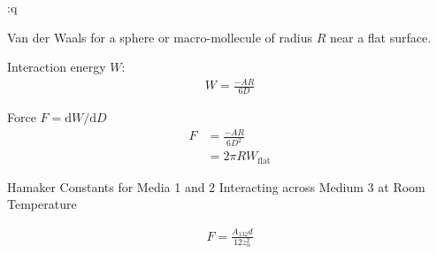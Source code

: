 :q


Van der Waals for a sphere or macro-mollecule of radius $R$ near a flat
surface.

Interaction energy $W$:
\begin{align}
 W=\frac{-AR}{6D}
\end{align}

Force $F=\mathrm{d}W/\mathrm{d}D$
\begin{align}
 F&=\frac{-AR}{6D^2}\\
  &=2\pi R W_\text{flat}
\end{align}

Hamaker Constants for Media 1 and 2 Interacting across Medium 3
at Room Temperature

\begin{align}
	F=\frac{A_{132} d}{12 z_\alpha^2}
\end{align}
